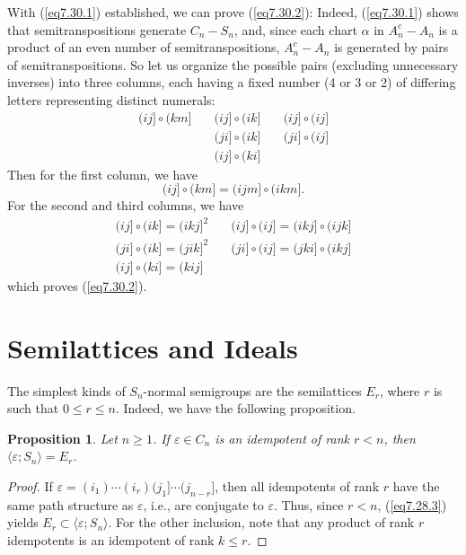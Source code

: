 \documentclass{surv-l}
\numberwithin{equation}{section}
\numberwithin{table}{section}
\numberwithin{figure}{section}
\newtheorem{proposition}[equation]{Proposition}
\theoremstyle{definition}
\begin{document}
With (\ref{eq7.30.1}) established, we can prove (\ref{eq7.30.2}):
Indeed, (\ref{eq7.30.1}) shows that semitranspositions generate
$C_{n}-S_{n}$, and, since each chart $\alpha$ in $A_{n}^{c}-A_{n}$
is a product of an even number of semitranspositions,
$A_{n}^{c}-A_{n}$ is generated by pairs of semitranspositions. So
let us organize the possible pairs (excluding unnecessary
inverses) into three columns, each having a fixed number (4 or 3
or 2) of differing letters representing distinct numerals:
\[
\begin{array}{lll}
(ij]\circ (km] &\quad (ij]\circ(ik] &\quad(ij]\circ(ij] \\
&\quad (ji]\circ(ik] &\quad (ji]\circ(ij] \\
&\quad (ij]\circ(ki] &
\end{array}
\]
Then for the first column, we have
\[
(ij]\circ (km]=(ijm]\circ (ikm].
\]
For the second and third columns, we have
\[
\begin{array}{ll}
(ij]\circ (ik]=(ikj]^{2} &\quad (ij]\circ (ij]=(ikj]\circ (ijk] \\
(ji]\circ (ik]=(jik]^{2} &\quad (ji]\circ (ij]=(jki]\circ (ikj] \\
(ij]\circ(ki]=(kij] &
\end{array}
\]
which proves (\ref{eq7.30.2}).

\section{Semilattices and Ideals}\label{sec7.31}

The simplest kinds of $S_{n}$-normal semigroups are the
semilattices $E_{r}$, where $r$ is such that
$0\leq r\leq n$. Indeed, we have the following proposition.

\begin{proposition}\label{prop2.31.1}
Let $n \geq 1$. If $\varepsilon \in C_{n}$ is an idempotent of
rank $r<n$, then $\langle\varepsilon; S_{n}\rangle=E_{r}$.
\end{proposition}

\begin{proof} If $\varepsilon =(i_{1})\cdots(i_{r})(j_{1}]\cdots(j_{n-r}]$,
then all idempotents of rank $r$ have the same path structure as
$\varepsilon$, i.e., are conjugate to $\varepsilon$. Thus, since
$r<n$, (\ref{eq7.28.3}) yields
$E_{r}\subset\langle \varepsilon;S_{n}\rangle$. For the other inclusion, note
that any product of rank $r$ idempotents is an idempotent of rank
$k\leq r.$
\end{proof}
\end{document}

